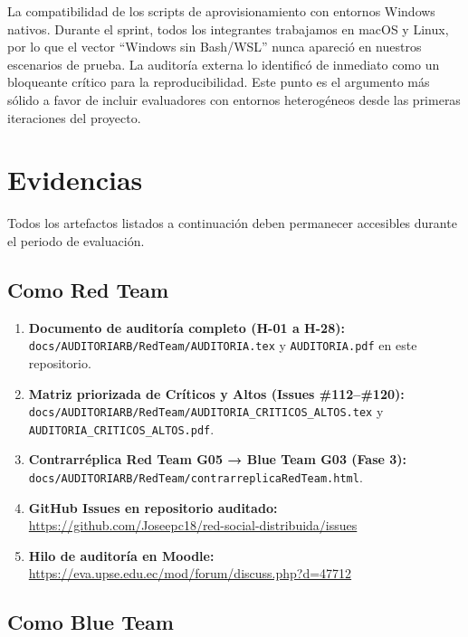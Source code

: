 \documentclass[10pt,a4paper]{article}
\newcommand{\code}[1]{\nolinkurl{#1}}
\begin{document}
La compatibilidad de los scripts de aprovisionamiento con entornos Windows nativos. Durante el sprint, todos los integrantes trabajamos en macOS y Linux, por lo que el vector ``Windows sin Bash/WSL'' nunca apareció en nuestros escenarios de prueba. La auditoría externa lo identificó de inmediato como un bloqueante crítico para la reproducibilidad. Este punto es el argumento más sólido a favor de incluir evaluadores con entornos heterogéneos desde las primeras iteraciones del proyecto.

\section{Evidencias}

\begin{tcolorbox}[colback=lightgray!50,colframe=upseblue!30,arc=2mm]
\small Todos los artefactos listados a continuación deben permanecer accesibles durante el periodo de evaluación.
\end{tcolorbox}

\subsection{Como Red Team}

\begin{enumerate}[leftmargin=*]
  \item \textbf{Documento de auditoría completo (H-01 a H-28):} \code{docs/AUDITORIARB/RedTeam/AUDITORIA.tex} y \code{AUDITORIA.pdf} en este repositorio.
  \item \textbf{Matriz priorizada de Críticos y Altos (Issues \#112--\#120):} \code{docs/AUDITORIARB/RedTeam/AUDITORIA\_CRITICOS\_ALTOS.tex} y \code{AUDITORIA\_CRITICOS\_ALTOS.pdf}.
  \item \textbf{Contrarréplica Red Team G05 → Blue Team G03 (Fase 3):} \code{docs/AUDITORIARB/RedTeam/contrarreplicaRedTeam.html}.
  \item \textbf{GitHub Issues en repositorio auditado:} \url{https://github.com/Joseepc18/red-social-distribuida/issues}
  \item \textbf{Hilo de auditoría en Moodle:} \url{https://eva.upse.edu.ec/mod/forum/discuss.php?d=47712}
\end{enumerate}

\subsection{Como Blue Team}
\end{document}
